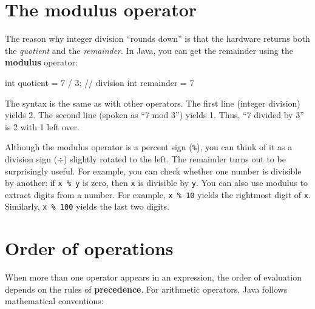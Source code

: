 \section{The modulus operator}


The reason why integer division ``rounds down'' is that the hardware returns both the {\em quotient} and the {\em remainder}.
In Java, you can get the remainder using the {\bf modulus} operator:

\begin{code}
    int quotient = 7 / 3;   // division
    int remainder = 7 %
\end{code}

The syntax is the same as with other operators.
The first line (integer division) yields 2.
The second line (spoken as ``7 mod 3'') yields 1.
Thus, ``7 divided by 3'' is 2 with 1 left over.


Although the modulus operator is a percent sign ({\tt \%}), you can think of it as a division sign ($\div$) slightly rotated to the left.
The remainder turns out to be surprisingly useful.
For example, you can check whether one number is divisible by another: if {\tt x \% y} is zero, then {\tt x} is divisible by {\tt y}.
You can also use modulus to extract digits from a number.
For example, {\tt x \% 10} yields the rightmost digit of {\tt x}.
Similarly, {\tt x \% 100} yields the last two digits.


\section{Order of operations}


When more than one operator appears in an expression, the order of evaluation depends on the rules of {\bf precedence}.
For arithmetic operators, Java follows mathematical conventions:

